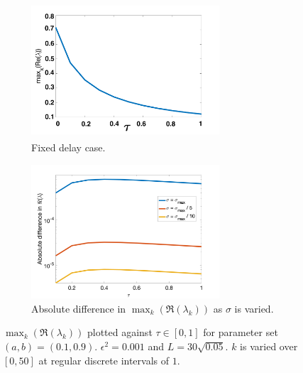 \begin{figure}[H]
    \centering
    \begin{subfigure}[b]{0.45\textwidth}
        \centering
        \includegraphics[width=7cm,height=5cm]{p2fixed.png}
        \caption{Fixed delay case.}
        \label{}
    \end{subfigure}
    \hfill
    \begin{subfigure}[b]{0.45\textwidth}
        \centering
        \includegraphics[width=7cm,height=5cm]{dispdiff1.png}
        \caption{Absolute difference in $\max_k(\Re(\lambda_k))$ as $\sigma$ is varied.}
        \label{}
    \end{subfigure}
    \caption{$\max_k(\Re(\lambda_k))$ plotted against $\tau\in[0,1]$ for parameter set $(a,b)=(0.1,0.9)$. $\epsilon^2=0.001$ and $L=30\sqrt{0.05}$. $k$ is varied over $[0,50]$ at regular discrete intervals of $1$.}
    \label{fig:p2}
\end{figure}
